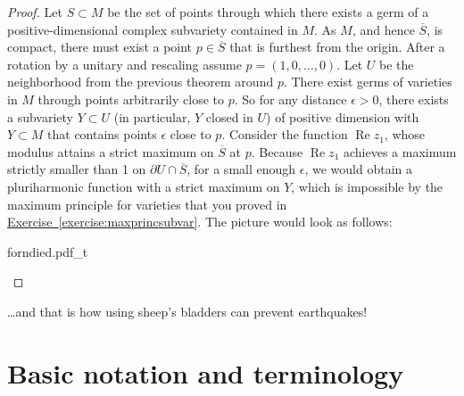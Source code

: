 \documentclass[12pt,openany]{book}
\renewcommand{\Re}{\operatorname{Re}}
\theoremstyle{plain}
\theoremstyle{remark}
\theoremstyle{definition}
\newenvironment{myfig}{%
    \begin{center}
}{%
    \end{center}
}
\theoremstyle{exercise}
\theoremstyle{example}
\newcommand{\exerciseref}[1]{\hyperref[#1]{Exercise~\ref*{#1}}}
\begin{document}
\begin{proof}
Let $S \subset M$ be the set of points through which there exists 
a germ of a positive-dimensional complex subvariety contained in $M$.
As $M$, and hence $\overline{S}$, is compact,
there must exist a point $p \in \overline{S}$
that is furthest from
the origin.  After a rotation by a unitary and rescaling assume
$p=(1,0,\ldots,0)$.  Let $U$ be the neighborhood from the previous
theorem around $p$.  There exist germs of varieties in $M$ through points
arbitrarily close to $p$.  So for any distance $\epsilon > 0$,
there exists a subvariety $Y \subset U$ (in particular, $Y$ closed in $U$)
of positive dimension with $Y \subset M$ that contains points 
$\epsilon$ close to $p$.  Consider the function $\Re z_1$, whose modulus attains a
strict maximum on $\overline{S}$ at $p$.  Because $\Re z_1$ achieves a maximum
strictly smaller than 1 on $\partial U \cap \overline{S}$, for a small enough $\epsilon$,
we would obtain a pluriharmonic function with a strict
maximum on $Y$, which is impossible by the maximum principle for
varieties that you proved in \exerciseref{exercise:maxprincsubvar}.
The picture would look as follows:
\begin{myfig}
\medskip
{forndied.pdf_t}
\end{myfig}
\end{proof}

\vspace{1in}

\ldots and that is how using sheep's bladders can prevent
earthquakes!


\appendix



\chapter{Basic notation and terminology} \label{ap:basicnotation}
\end{document}
